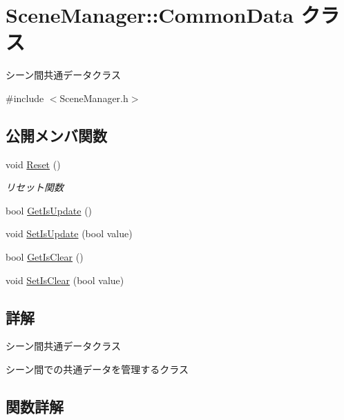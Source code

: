 \hypertarget{class_scene_manager_1_1_common_data}{}\section{Scene\+Manager\+:\+:Common\+Data クラス}
\label{class_scene_manager_1_1_common_data}


シーン間共通データクラス  




{\ttfamily \#include $<$Scene\+Manager.\+h$>$}

\subsection*{公開メンバ関数}
\begin{DoxyCompactItemize}
\item 
void \mbox{\hyperlink{class_scene_manager_1_1_common_data_a32823be65c187b909e4159cef57931a9}{Reset}} ()
\begin{DoxyCompactList}\small\item\em リセット関数 \end{DoxyCompactList}\item 
bool \mbox{\hyperlink{class_scene_manager_1_1_common_data_a2c327aafbb4586642088df083f2deb77}{Get\+Is\+Update}} ()
\item 
void \mbox{\hyperlink{class_scene_manager_1_1_common_data_a5262310a89cbc72feef171229b206225}{Set\+Is\+Update}} (bool value)
\item 
bool \mbox{\hyperlink{class_scene_manager_1_1_common_data_a86ece05b1ec69436d892f22227ee5129}{Get\+Is\+Clear}} ()
\item 
void \mbox{\hyperlink{class_scene_manager_1_1_common_data_aa5f093bf08440c8e3a4c26ce29067600}{Set\+Is\+Clear}} (bool value)
\end{DoxyCompactItemize}


\subsection{詳解}
シーン間共通データクラス 

シーン間での共通データを管理するクラス 

\subsection{関数詳解}
\mbox{\label{class_scene_manager_1_1_common_data_a86ece05b1ec69436d892f22227ee5129}} 
